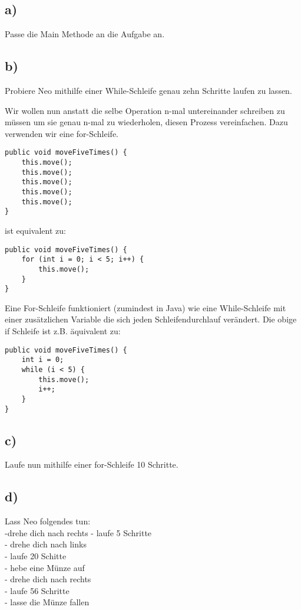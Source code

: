 \subsection*{a)}
	Passe die Main Methode an die Aufgabe an.
\subsection*{b)}

	Probiere Neo mithilfe einer While-Schleife genau zehn Schritte laufen zu lassen.

\begin{Infobox}
		Wir wollen nun anstatt die selbe Operation n-mal untereinander schreiben zu müssen um sie genau n-mal zu wiederholen, diesen Prozess vereinfachen.
		Dazu verwenden wir eine for-Schleife. 
		\begin{lstlisting}
public void moveFiveTimes() {
	this.move();
	this.move();
	this.move();
	this.move();
	this.move();
}
		\end{lstlisting}
		ist equivalent zu:
		\begin{lstlisting}
public void moveFiveTimes() {
	for (int i = 0; i < 5; i++) {
		this.move();
	}
}
		\end{lstlisting}
Eine For-Schleife funktioniert (zumindest in Java) wie eine While-Schleife mit einer zusätzlichen Variable die sich jeden Schleifendurchlauf verändert.
Die obige if Schleife ist z.B. äquivalent zu:
		\begin{lstlisting}
public void moveFiveTimes() {
	int i = 0;
	while (i < 5) {
		this.move();
		i++;
	}
}
		\end{lstlisting}
 \end{Infobox}

\subsection*{c)}
Laufe nun mithilfe einer for-Schleife 10 Schritte.

\subsection*{d)}
Lass Neo folgendes tun:\\
	-drehe dich nach rechts
	- laufe 5 Schritte\\
	- drehe dich nach links\\ 
	- laufe 20 Schitte\\
	- hebe eine Münze auf\\
	- drehe dich nach rechts\\
	- laufe 56 Schritte\\
	- lasse die Münze fallen

